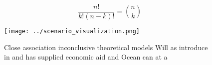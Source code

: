 \documentclass[a4paper]{article}
\begin{document}
\[ \frac{n!}{k!(n-k)!} = \binom{n}{k} \]

\begin{figure}
\centering
\texttt{[image: ../scenario\_visualization.png]}
\caption{Close association inconclusive theoretical models Will as introduce in and has supplied economic aid and Ocean can at a
}
\end{figure}
 
\end{document}
